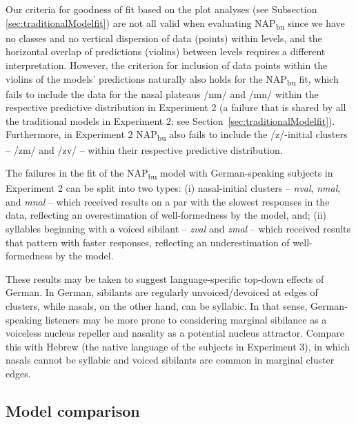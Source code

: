 
Our criteria for goodness of fit based on the plot analyses (see Subsection
\ref{sec:traditionalModelfit}) are not all valid when evaluating NAP\textsubscript{bu} since we have no classes and no vertical dispersion of data (points) within levels, and the horizontal overlap of predictions (violins) between levels requires a different interpretation. However, the criterion for inclusion of data points within the violins of the models' predictions naturally also holds for the NAP\textsubscript{bu} fit, which fails to include the data for the nasal plateaus /nm/ and /mn/ within the respective predictive distribution in Experiment 2 (a failure that is shared by all the traditional models in Experiment 2; see Section~\ref{sec:traditionalModelfit}). Furthermore, in Experiment 2 NAP\textsubscript{bu} also fails to include the /z/-initial clusters -- /zm/ and /zv/ -- within their respective predictive distribution.

The failures in the fit of the NAP\textsubscript{bu} model with German-speaking subjects in Experiment 2 can be split into two types:
(i) nasal-initial clusters -- \emph{nval}, \emph{nmal}, and \emph{mnal} -- which received results on a par with the slowest responses in the data, reflecting an overestimation of well-formedness by the model, and;
(ii) syllables beginning with a voiced sibilant -- \emph{zval} and \emph{zmal} -- which received results that pattern with faster responses, reflecting
an underestimation of well-formedness by the model.

These results may be taken to suggest language-specific top-down effects of German. In German, sibilants are regularly unvoiced/devoiced at edges of clusters, while nasals, on the other hand, can be syllabic. In that sense, German-speaking listeners may be more prone to considering marginal sibilance as a voiceless nucleus repeller and nasality as a potential nucleus attractor.
Compare this with Hebrew (the native language of the subjects in Experiment 3), in which nasals cannot be syllabic and voiced sibilants are common in marginal cluster edges.

\subsection{Model comparison}\label{sec:modComp}

